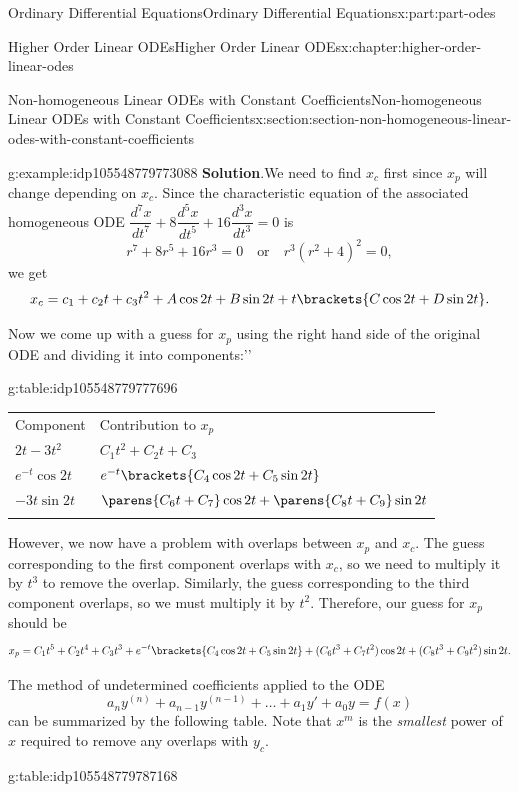 \documentclass[oneside,10pt,]{book}
\newcommand{\blocktitlefont}{\relax}
\newcommand{\tabularfont}{\relax}
\numberwithin{equation}{part}
\newcommand{\hrulethick} {\noalign{\hrule height 0.11em}}
\newcommand{\dv}[3][]{\dfrac{d^{#1} #2}{d #3^{#1}}}
\begin{document}
\begin{partptx}{Ordinary Differential Equations}{}{Ordinary Differential Equations}{}{}{x:part:part-odes}
\begin{chapterptx}{Higher Order Linear ODEs}{}{Higher Order Linear ODEs}{}{}{x:chapter:higher-order-linear-odes}
\begin{sectionptx}{Non-homogeneous Linear ODEs with Constant Coefficients}{}{Non-homogeneous Linear ODEs with Constant Coefficients}{}{}{x:section:section-non-homogeneous-linear-odes-with-constant-coefficients}
\begin{example}{}{g:example:idp105548779773088}
\noindent\textbf{\blocktitlefont Solution}.\hypertarget{g:solution:idp105548779774368}{}\quad{}We need to find \(x_{c}\) first since \(x_{p}\) will change depending on \(x_{c}\). Since the characteristic equation of the associated homogeneous ODE \(\dv[7]{x}{t}+8\dv[5]{x}{t}+16\dv[3]{x}{t}=0\) is%
\begin{equation*}
r^{7}+8r^{5}+16r^{3} = 0\quad\text{or}\quad r^{3}(r^{2}+4)^{2}=0,
\end{equation*}
we get%
\begin{equation*}
x_{c} = c_{1}+c_{2}t+c_{3}t^{2}+A\cos2t+B\sin2t + t\brackets{C\cos2t+D\sin2t}.
\end{equation*}
%
\par
Now we come up with a guess for \(x_{p}\) using the right hand side of the original ODE and dividing it into \textasciigrave{}\textasciigrave{}components:'{}'{}%
\begin{tableptx}{\textbf{}}{g:table:idp105548779777696}{}%
\centering%
{\tabularfont%
\begin{tabular}{ll}\hrulethick
Component&Contribution to \(x_{p}\)\tabularnewline\hrulethick
\(2t-3t^{2}\)&\(C_{1}t^{2}+C_{2}t+C_{3}\)\tabularnewline[0pt]
\(e^{-t}\cos2t\)&\(e^{-t}\brackets{C_{4}\cos2t+C_{5}\sin2t}\)\tabularnewline[0pt]
\(-3t\sin2t\)&\(\parens{C_{6}t+C_{7}}\cos2t+\parens{C_{8}t+C_{9}}\sin2t\)\tabularnewline\hrulethick
\end{tabular}
}%
\end{tableptx}%
However, we now have a problem with overlaps between \(x_{p}\) and \(x_{c}\). The guess corresponding to the first component overlaps with \(x_{c}\), so we need to multiply it by \(t^{3}\) to remove the overlap. Similarly, the guess corresponding to the third component overlaps, so we must multiply it by \(t^{2}\). Therefore, our guess for \(x_{p}\) should be%
\begin{equation*}
x_{p} = C_{1}t^{5}+C_{2}t^{4}+C_{3}t^{3}+e^{-t}\brackets{C_{4}\cos2t+C_{5}\sin2t}+(C_{6}t^{3}+C_{7}t^{2})\cos2t+(C_{8}t^{3}+C_{9}t^{2})\sin2t.
\end{equation*}
%
\end{example}
The method of undetermined coefficients applied to the ODE%
\begin{equation*}
a_{n}y^{(n)}+a_{n-1}y^{(n-1)}+\dots+a_{1}y'+a_{0}y = f(x)   
\end{equation*}
can be summarized by the following table. Note that \(x^m\) is the \emph{smallest} power of \(x\) required to remove any overlaps with \(y_{c}\).%
\begin{tableptx}{\textbf{}}{g:table:idp105548779787168}{}%

\end{tableptx}
\end{sectionptx}
\end{chapterptx}
\end{partptx}
\end{document}

